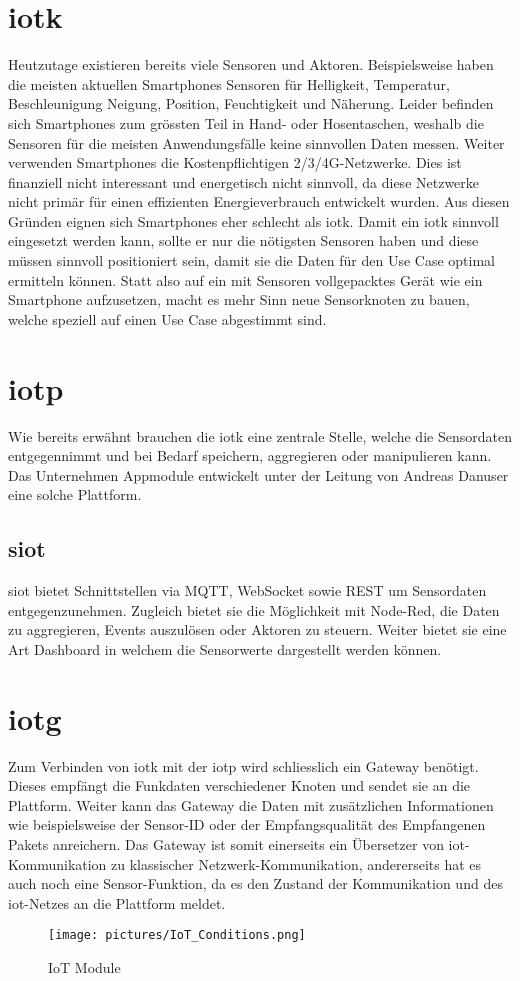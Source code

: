 \section{\gls{iotk}}
Heutzutage existieren bereits viele Sensoren und Aktoren. Beispielsweise haben die meisten aktuellen Smartphones Sensoren für Helligkeit, Temperatur, Beschleunigung Neigung, Position, Feuchtigkeit und Näherung. Leider befinden sich Smartphones zum grössten Teil in Hand- oder Hosentaschen, weshalb die Sensoren für die meisten Anwendungsfälle keine sinnvollen Daten messen. Weiter verwenden  Smartphones die Kostenpflichtigen 2/3/4G-Netzwerke. Dies ist finanziell nicht interessant und energetisch nicht sinnvoll, da diese Netzwerke nicht primär für einen effizienten Energieverbrauch entwickelt wurden. Aus diesen Gründen eignen sich Smartphones eher schlecht als \gls{iotk}. Damit ein \gls{iotk} sinnvoll eingesetzt werden kann, sollte er nur die nötigsten Sensoren haben und diese müssen sinnvoll positioniert sein, damit sie die Daten für den Use Case optimal ermitteln können. Statt also auf ein mit Sensoren vollgepacktes Gerät wie ein Smartphone aufzusetzen, macht es mehr Sinn neue Sensorknoten zu bauen, welche speziell auf einen Use Case abgestimmt sind.

\section{\gls{iotp}}
Wie bereits erwähnt brauchen die \gls{iotk} eine zentrale Stelle, welche die Sensordaten entgegennimmt und bei Bedarf speichern, aggregieren oder manipulieren kann. Das Unternehmen Appmodule entwickelt unter der Leitung von Andreas Danuser eine solche Plattform. 
\subsection*{\gls{siot}}
\gls{siot} bietet Schnittstellen via MQTT, WebSocket sowie REST um Sensordaten entgegenzunehmen. Zugleich bietet sie die Möglichkeit mit Node-Red, die Daten zu aggregieren, Events auszulösen oder Aktoren zu steuern. Weiter bietet sie eine Art Dashboard in welchem die Sensorwerte dargestellt werden können.

\section{\gls{iotg}}
Zum Verbinden von \gls{iotk} mit der \gls{iotp} wird schliesslich ein Gateway benötigt. Dieses empfängt die Funkdaten verschiedener Knoten und sendet sie an die Plattform. Weiter kann das Gateway die Daten mit zusätzlichen Informationen wie beispielsweise der Sensor-ID oder der Empfangsqualität des Empfangenen Pakets anreichern. Das Gateway ist somit einerseits ein Übersetzer von \gls{iot}-Kommunikation zu klassischer Netzwerk-Kommunikation, andererseits hat es auch noch eine Sensor-Funktion, da es den Zustand der Kommunikation und des \gls{iot}-Netzes an die Plattform meldet. 

\begin{figure}[H]
    \centering
        \texttt{[image: pictures/IoT\_Conditions.png]}
    \caption{IoT Module}
    \label{fig:IoT Module}
\end{figure}

